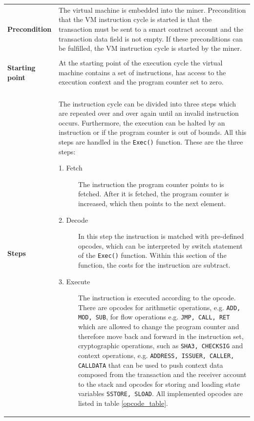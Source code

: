 \begin{tabular}[t]{ p{3cm} p{12.5cm}}
\raggedright
\textbf{Precondition} &
The virtual machine is embedded into the miner. Precondition that the VM instruction cycle is started is that the transaction must be sent to a smart contract account and the transaction data field is not empty. If these preconditions can be fulfilled, the VM instruction cycle is started by the miner. \\ \\

\raggedright
\textbf{Starting point} &
At the starting point of the execution cycle the virtual machine contains a set of instructions, has access to the execution context and the program counter set to zero. \\ \\

\textbf{Steps} &
The instruction cycle can be divided into three steps which are repeated over and over again until an invalid instruction occurs. Furthermore, the execution can be halted by an instruction or if the program counter is out of bounds. All this steps are handled in the \texttt{Exec()} function. These are the three steps:
\begin{description}
  \item[1. Fetch] The instruction the program counter points to is fetched. After it is fetched, the program counter is increased, which then points to the next element.
  \item[2. Decode] In this step the instruction is matched with pre-defined opcodes, which can be interpreted by switch statement of the \texttt{Exec()} function. Within this section of the function, the costs for the instruction are subtract.
  \item[3. Execute] The instruction is executed according to the opcode. There are opcodes for arithmetic operations, e.g. \texttt{ADD, MOD, SUB}, for flow operations e.g. \texttt{JMP, CALL, RET} which are allowed to change the program counter and therefore move back and forward in the instruction set, cryptographic operations, such as \texttt{SHA3, CHECKSIG} and context operations, e.g. \texttt{ADDRESS, ISSUER, CALLER, CALLDATA} that can be used to push context data composed from the transaction and the receiver account to the stack and opcodes for storing and loading state variables \texttt{SSTORE, SLOAD}. All implemented opcodes are listed in table \ref{opcode_table}.
    \end{description}
\end{tabular}

